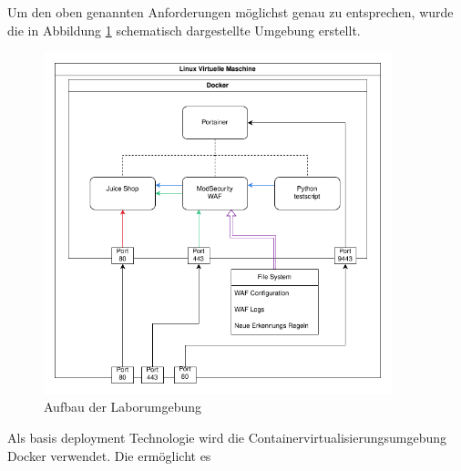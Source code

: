 Um den oben genannten Anforderungen möglichst genau zu entsprechen, wurde die in Abbildung \ref{fig:lab} schematisch dargestellte Umgebung erstellt.

\begin{figure}[!hbt]
    \centering
    \includegraphics[width=0.9\textwidth]{./images/lab-setup.png}
    \caption{Aufbau der Laborumgebung}
    \label{fig:lab}
\end{figure}

Als basis deployment Technologie wird die Containervirtualisierungsumgebung Docker verwendet. Die ermöglicht es 